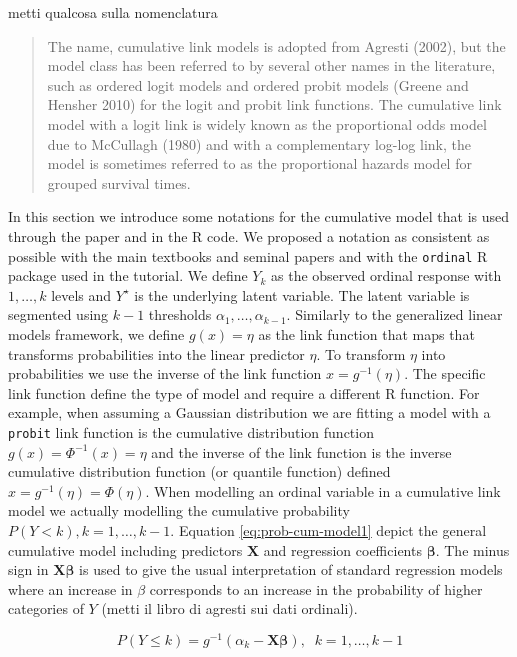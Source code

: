 \documentclass[
  man,floatsintext]{apa6}
\begin{document}
metti qualcosa sulla nomenclatura

\begin{quote}
The name, cumulative link models is adopted from Agresti (2002), but the model class has
been referred to by several other names in the literature, such as ordered logit models and
ordered probit models (Greene and Hensher 2010) for the logit and probit link functions. The
cumulative link model with a logit link is widely known as the proportional odds model due
to McCullagh (1980) and with a complementary log-log link, the model is sometimes referred
to as the proportional hazards model for grouped survival times.
\end{quote}

In this section we introduce some notations for the cumulative model that is used through the paper and in the R code. We proposed a notation as consistent as possible with the main textbooks and seminal papers and with the \texttt{ordinal} R package used in the tutorial. We define \(Y_k\) as the observed ordinal response with \(1, \dots,k\) levels and \(Y^\star\) is the underlying latent variable. The latent variable is segmented using \(k - 1\) thresholds \(\alpha_1, \dots, \alpha_{k - 1}\). Similarly to the generalized linear models framework, we define \(g(x) = \eta\) as the link function that maps that transforms probabilities into the linear predictor \(\eta\). To transform \(\eta\) into probabilities we use the inverse of the link function \(x = g^{-1}(\eta)\). The specific link function define the type of model and require a different R function. For example, when assuming a Gaussian distribution we are fitting a model with a \texttt{probit} link function is the cumulative distribution function \(g(x) = \Phi^{-1}(x) = \eta\) and the inverse of the link function is the inverse cumulative distribution function (or quantile function) defined \(x = g^{-1}(\eta) = \Phi(\eta)\). When modelling an ordinal variable in a cumulative link model we actually modelling the cumulative probability \(P(Y < k), k = 1, \dots, k - 1\). Equation \eqref{eq:prob-cum-model1} depict the general cumulative model including predictors \(\mathbf{X}\) and regression coefficients \(\boldsymbol{\beta}\). The minus sign in \(\mathbf{X} \boldsymbol{\beta}\) is used to give the usual interpretation of standard regression models where an increase in \(\beta\) corresponds to an increase in the probability of higher categories of \(Y\) (metti il libro di agresti sui dati ordinali).

\begin{equation} 
P(Y \leq k) = g^{-1}(\alpha_k - \mathbf{X} \boldsymbol{\beta}), \;\;k = 1, \dots, k - 1
\label{eq:prob-cum-model1}
\end{equation}
\end{document}
